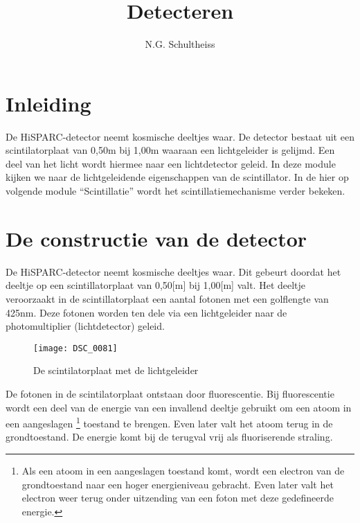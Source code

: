 



\title{Detecteren}
\author{N.G. Schultheiss}
\date{}

\maketitle
\thispagestyle{firststyle}

\section{Inleiding}

De HiSPARC-detector neemt kosmische deeltjes waar. De detector bestaat
uit een scintilatorplaat van 0,50m bij 1,00m waaraan een lichtgeleider
is gelijmd. Een deel van het licht wordt hiermee naar een lichtdetector
geleid. In deze module kijken we naar de lichtgeleidende eigenschappen
van de scintillator. In de hier op volgende module ``Scintillatie''
wordt het scintillatiemechanisme verder bekeken. 


\section{De constructie van de detector}

De HiSPARC-detector neemt kosmische deeltjes waar. Dit gebeurt doordat
het deeltje op een scintillatorplaat van 0,50{[}m{]} bij 1,00{[}m{]}
valt. Het deeltje veroorzaakt in de scintillatorplaat een aantal fotonen
met een golflengte van 425nm. Deze fotonen worden ten dele via een
lichtgeleider naar de photomultiplier (lichtdetector) geleid.

\begin{figure}[H]
\noindent \begin{centering}
\texttt{[image: DSC\_0081]}
\par\end{centering}
\caption{De scintilatorplaat met de lichtgeleider}
\end{figure}


De fotonen in de scintilatorplaat ontstaan door fluorescentie. Bij
fluorescentie wordt een deel van de energie van een invallend deeltje
gebruikt om een atoom in een aangeslagen \footnote{Als een atoom in een
aangeslagen toestand komt, wordt een electron van de grondtoestand naar
een hoger energieniveau gebracht. Even later valt het electron weer
terug onder uitzending van een foton met deze gedefineerde energie.}
toestand te brengen. Even later valt het atoom terug in de
grondtoestand. De energie komt bij de terugval vrij als fluoriserende
straling.

